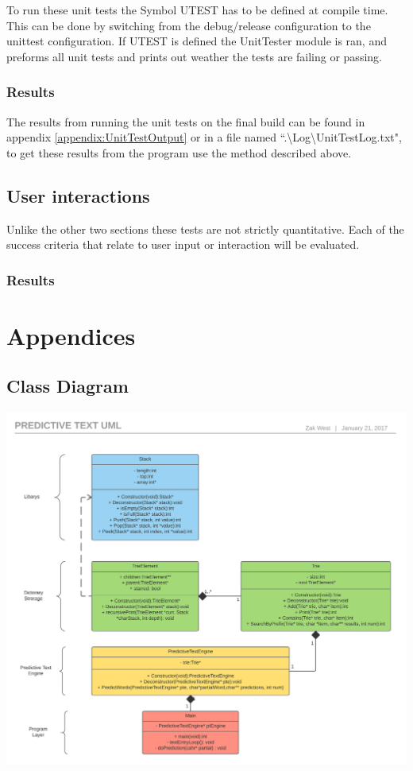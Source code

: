 \documentclass[10pt]{article} %
\begin{document}
		    To run these unit tests the Symbol UTEST has to be defined at compile time. This can be done by switching from the debug/release configuration to the unittest configuration. If UTEST is defined the UnitTester module is ran, and preforms all unit tests and prints out weather the tests are failing or passing. 
		    
            \subsubsection{Results}
			     The results from running the unit tests on the final build can be found in appendix \ref{appendix:UnitTestOutput} or in a file named ``.\textbackslash Log\textbackslash UnitTestLog.txt", to get these results from the program use the method described above.
			     
		\subsection{User interactions}
			Unlike the other two sections these tests are not strictly quantitative. Each of the success criteria that relate to user input or interaction will be evaluated. 
			
			\subsubsection{Results}
            

		
	\newpage
	\printbibliography
	\newpage
	
    \appendix
    \section*{Appendices}
    \renewcommand{\thesubsection}{\Alph{subsection}}

    \subsection{Class Diagram}
        \includegraphics[width=\textwidth]{PredictiveTextUML}
\end{document}

